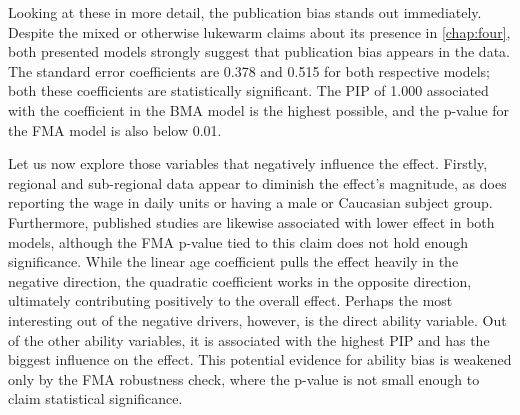 {\begin{singlespace}
\begin{notsotiny}
\end{notsotiny}
\end{singlespace}
}

Looking at these in more detail, the publication bias stands out immediately. Despite the mixed or otherwise lukewarm claims about its presence in \autoref{chap:four}, both presented models strongly suggest that publication bias appears in the data. The standard error coefficients are 0.378 and 0.515 for both respective models; both these coefficients are statistically significant. The \ac{PIP} of 1.000 associated with the coefficient in the \ac{BMA} model is the highest possible, and the p-value for the \ac{FMA} model is also below 0.01.

Let us now explore those variables that negatively influence the effect. Firstly, regional and sub-regional data appear to diminish the effect's magnitude, as does reporting the wage in daily units or having a male or Caucasian subject group. Furthermore, published studies are likewise associated with lower effect in both models, although the \ac{FMA} p-value tied to this claim does not hold enough significance. While the linear age coefficient pulls the effect heavily in the negative direction, the quadratic coefficient works in the opposite direction, ultimately contributing positively to the overall effect. Perhaps the most interesting out of the negative drivers, however, is the direct ability variable. Out of the other ability variables, it is associated with the highest \ac{PIP} and has the biggest influence on the effect. This potential evidence for ability bias is weakened only by the \ac{FMA} robustness check, where the p-value is not small enough to claim statistical significance.


